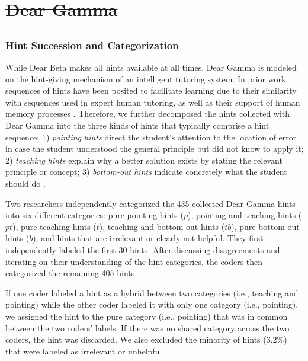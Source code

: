 \documentclass[12pt,twoside]{mitthesis}
\providecommand{\DIFaddtex}[1]{{\protect\color{blue}\uwave{#1}}} %
\providecommand{\DIFdeltex}[1]{{\protect\color{red}\sout{#1}}}                      %
\providecommand{\DIFaddbegin}{} %
\providecommand{\DIFaddend}{} %
\providecommand{\DIFdelbegin}{} %
\providecommand{\DIFdelend}{} %
\providecommand{\DIFadd}[1]{\texorpdfstring{\DIFaddtex{#1}}{#1}} %
\providecommand{\DIFdel}[1]{\texorpdfstring{\DIFdeltex{#1}}{}} %
\begin{document}
{{{{{{{{{{\DIFdelbegin \section{\DIFdel{Dear Gamma}}
\addtocounter{section}{-1}%
\DIFdelend \DIFaddbegin \subsection{\DIFadd{Dear Gamma}}
\DIFaddend 

\subsubsection{Hint Succession and Categorization}
\DIFaddbegin 

\DIFaddend While Dear Beta makes all hints available at all times, Dear Gamma is modeled on the hint-giving mechanism of an intelligent tutoring system. In prior work, sequences of hints have been posited to facilitate learning due to their similarity with sequences used in expert human tutoring, as well as their support of human memory processes \cite{sottilare2014design}. Therefore, we further decomposed the hints collected with Dear Gamma into the three kinds of hints that typically comprise a hint sequence: 1) \textit{pointing hints} direct the student's attention to the location of error in case the student understood the general principle but did not know to apply it; 2) \textit{teaching hints} explain why a better solution exists by stating the relevant principle or concept; 3) \textit{bottom-out hints} indicate concretely what the student should do \cite{andes}. 

Two researchers independently categorized the 435 collected Dear Gamma hints into six different categories: pure pointing hints ($p$), pointing and teaching hints ($pt$), pure teaching hints ($t$), teaching and bottom-out hints ($tb$), pure bottom-out hints ($b$), and hints that are irrelevant or clearly not helpful. They first independently labeled the first 30 hints. After discussing disagreements and iterating on their understanding of the hint categories, the coders then categorized the remaining 405 hints. 

If one coder labeled a hint as a hybrid between two categories (i.e., teaching and pointing) while the other coder labeled it with only one category (i.e., pointing), we assigned the hint to the pure category (i.e., pointing) that was in common between the two coders' labels. If there was no shared category across the two coders, the hint was discarded. We also excluded the minority of hints (3.2\%) that were labeled as irrelevant or unhelpful.

}}}}}}}}}}
\end{document}
